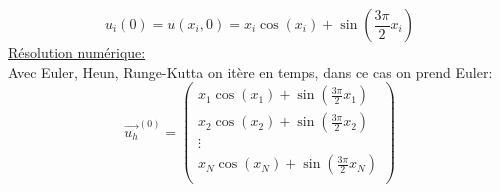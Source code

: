 \begin{equation*}
    u_i(0)=u(x_i,0)=x_i\cos(x_i)+\sin(\frac{3\pi}{2}x_i)
\end{equation*}
\underline{Résolution numérique:}\\
Avec Euler, Heun, Runge-Kutta on itère en temps, dans ce cas on prend Euler:
\begin{equation*}
    \overrightarrow{u_h}^{(0)}=
    \begin{pmatrix}
        x_1\cos(x_1)+\sin(\frac{3\pi}{2}x_1) \\
        x_2\cos(x_2)+\sin(\frac{3\pi}{2}x_2) \\
        \vdots                               \\
        x_N\cos(x_N)+\sin(\frac{3\pi}{2}x_N) \\
    \end{pmatrix}
\end{equation*}

